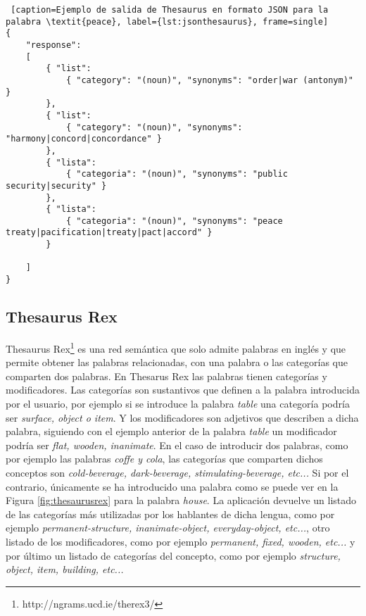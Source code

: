 
\begin{lstlisting} [caption=Ejemplo de salida de Thesaurus en formato JSON para la palabra \textit{peace}, label={lst:jsonthesaurus}, frame=single]
{
	"response":
	[
		{ "list": 
			{ "category": "(noun)", "synonyms": "order|war (antonym)" }
		},
		{ "list": 
			{ "category": "(noun)", "synonyms": "harmony|concord|concordance" }
		},
		{ "lista": 
			{ "categoria": "(noun)", "synonyms": "public security|security" }
		},
		{ "lista": 
			{ "categoria": "(noun)", "synonyms": "peace treaty|pacification|treaty|pact|accord" }
		}
	
	]
}
\end{lstlisting}




\subsection{Thesaurus Rex}
\label{cap:subsec:thesaurusrex}

Thesaurus Rex\footnote{http://ngrams.ucd.ie/therex3/} es una red semántica que solo admite palabras en inglés y que permite obtener las palabras relacionadas, con una palabra o las categorías que comparten dos palabras.
En Thesarus Rex las palabras tienen categorías y modificadores. Las categorías son sustantivos que definen a la palabra introducida por el usuario, por ejemplo si se introduce la palabra \textit{table} una categoría podría ser \textit{surface, object o item}. Y los modificadores son adjetivos que describen a dicha palabra, siguiendo con el ejemplo anterior de la palabra \textit{table} un modificador podría ser \textit{flat, wooden, inanimate}.
En el caso de introducir dos palabras, como por ejemplo las palabras \textit{coffe y cola}, las categorías que comparten dichos conceptos son \textit{cold-beverage, dark-beverage, stimulating-beverage, etc...}
Si por el contrario, únicamente se ha introducido una palabra como se puede ver en la Figura \ref{fig:thesaurusrex} para la palabra  \textit{house}. La aplicación devuelve un listado de las categorías más utilizadas por los hablantes de dicha lengua, como por ejemplo \textit{permanent-structure, inanimate-object, everyday-object, etc...},
 otro listado de los modificadores, como por ejemplo \textit{permanent, fixed, wooden, etc...} y por último un listado de categorías del concepto, como por ejemplo \textit{structure, object, item, building, etc...}

